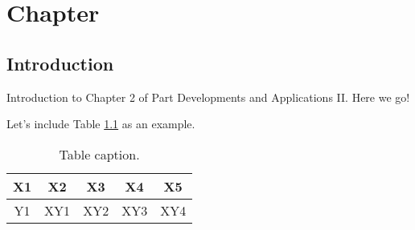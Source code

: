 \chapter{Chapter}
\label{sect:devs02_chapter2}

\section{Introduction}
\label{sect::devs02_chapter2_intro}

Introduction to Chapter 2 of Part Developments and Applications II. Here we go!

Let's include Table \ref{tab::table01} as an example.

\begin{table}[h]     
	\caption{Table caption.}
	\label{tab::table01}
	\footnotesize
	\begin{center}
		\begin{tabular}{ccccc}
			\toprule
			X1 & X2 & X3 & X4 & X5\\
			\midrule
            Y1 & XY1 & XY2 & XY3 & XY4\\
			\bottomrule
		\end{tabular}
	\end{center}
\end{table}